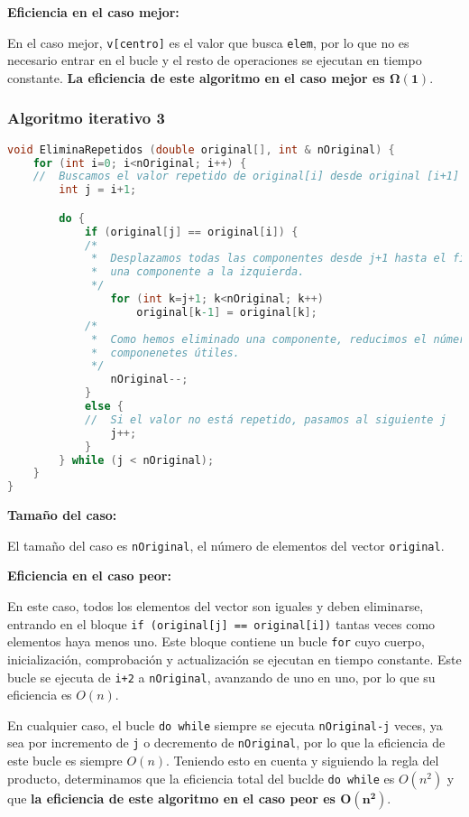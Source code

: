 \textbf{Eficiencia en el caso mejor:}

En el caso mejor, \texttt{v[centro]} es el valor que busca \texttt{elem}, por lo que no es necesario entrar en el bucle y el resto de operaciones se ejecutan en tiempo constante.
\textbf{La eficiencia de este algoritmo en el caso mejor es $\boldsymbol{\Omega(1)}$}.

\pagebreak

\subsubsection{Algoritmo iterativo 3}

\begin{lstlisting}[language=C]
void EliminaRepetidos (double original[], int & nOriginal) {
	for (int i=0; i<nOriginal; i++) {
	//	Buscamos el valor repetido de original[i] desde original [i+1] hasta el final.
		int j = i+1;

		do {
			if (original[j] == original[i]) {
			/*
			 *	Desplazamos todas las componentes desde j+1 hasta el final,
			 *	una componente a la izquierda.
			 */
				for (int k=j+1; k<nOriginal; k++)
					original[k-1] = original[k];
			/*
			 *	Como hemos eliminado una componente, reducimos el número de
			 *	componenetes útiles.
			 */
				nOriginal--;
			}
			else {
			//	Si el valor no está repetido, pasamos al siguiente j
				j++;
			}
		} while (j < nOriginal);
	}
}
\end{lstlisting}

\textbf{Tamaño del caso:}

El tamaño del caso es \texttt{nOriginal}, el número de elementos del vector \texttt{original}.

\textbf{Eficiencia en el caso peor:}

En este caso, todos los elementos del vector son iguales y deben eliminarse, entrando en el bloque \texttt{if (original[j] == original[i])} tantas veces como elementos haya menos uno.
Este bloque contiene un bucle \texttt{for} cuyo cuerpo, inicialización, comprobación y actualización se ejecutan en tiempo constante.
Este bucle se ejecuta de \texttt{i+2} a \texttt{nOriginal}, avanzando de uno en uno, por lo que su eficiencia es $O(n)$.

En cualquier caso, el bucle \texttt{do while} siempre se ejecuta \texttt{nOriginal-j} veces, ya sea por incremento de \texttt{j} o decremento de \texttt{nOriginal}, por lo que la eficiencia de este bucle es siempre $O(n)$.
Teniendo esto en cuenta y siguiendo la regla del producto, determinamos que la eficiencia total del buclde \texttt{do while} es $O(n^2)$ y que \textbf{la eficiencia de este algoritmo en el caso peor es $\boldsymbol{O(n^2)}$}.

